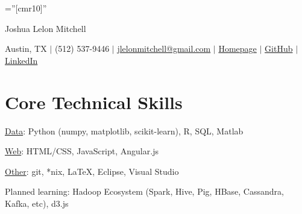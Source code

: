 \documentclass[a4paper,10pt]{article}
\begin{document}

\pagestyle{empty} %

\font\fb=''[cmr10]'' %

\par{\centering
		{\Huge Joshua Lelon Mitchell
	}\par}
\par{\centering
		{
	Austin, TX
	$\mid$
	(512) 537-9446
	$\mid$
	\href {mailto:jlelonmitchell@gmail.com}{jlelonmitchell@gmail.com}
	$\mid$
	\href {http://lelon.io/}{Homepage}
	$\mid$
	\href {https://github.com/joshualmitchell}{GitHub}
	$\mid$
	\href {https://www.linkedin.com/in/joshua-mitchell-17b94077/}{LinkedIn}
}\par}

\section{Core Technical Skills}

\underline{Data}: Python (numpy, matplotlib, scikit-learn), R, SQL, Matlab

\underline{Web}: HTML/CSS, JavaScript, Angular.js

\underline{Other}: git, *nix, LaTeX, Eclipse, Visual Studio

Planned learning: Hadoop Ecosystem (Spark, Hive, Pig, HBase, Cassandra, Kafka, etc), d3.js

\end{document}

